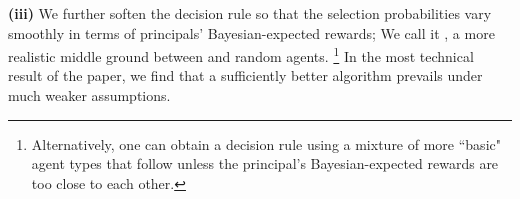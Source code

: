 \textbf{(iii)} We further soften the decision rule so that the selection probabilities vary smoothly in terms of principals' Bayesian-expected rewards;
We call it \SoftMaxRandom, a more realistic middle ground between \HardMax and random agents.%
\footnote{Alternatively, one can obtain a \SoftMaxRandom decision rule using a mixture of more ``basic" agent types that follow \HardMax unless the principal's Bayesian-expected rewards are too close to each other.}
In the most technical result of the paper, we find that a sufficiently better algorithm prevails under much weaker assumptions.





%


